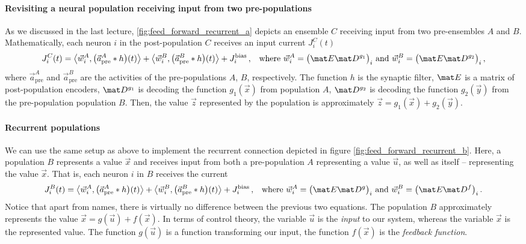 \documentclass[10pt,letterpaper,oneside]{article}
\begin{document}
\paragraph{Revisiting a neural population receiving input from two pre-populations}
As we discussed in the last lecture, \cref{fig:feed_forward_recurrent_a} depicts an ensemble $C$ receiving input from two pre-ensembles $A$ and $B$. Mathematically, each neuron $i$ in the post-population $C$ receives an input current $J^C_i(t)$
\begin{align*}
	J^C_i(t) &= \big\langle \vec w_i^A , \big ( \vec a^{A}_\mathrm{pre} \ast h \big)(t) \big\rangle
	        + \big\langle \vec w_i^B , \big ( \vec a^{B}_\mathrm{pre} \ast h \big)(t) \big\rangle
	        + J^\mathrm{bias}_i \,,
	       & \text{where } \vec w^A_i = \big( \mat E \mat D^{g_1} \big)_i \text{ and } \vec w^B_i = \big( \mat E \mat D^{g_2} \big)_i \,,
\end{align*}
where $\vec a^{A}_\mathrm{pre}$ and $\vec a^{B}_\mathrm{pre}$ are the activities of the pre-populations $A$, $B$, respectively. The function $h$ is the synaptic filter, $\mat E$ is a matrix of post-population encoders, $\mat D^{g_1}$ is decoding the function $g_1(\vec x)$ from population $A$, $\mat D^{g_2}$ is decoding the function ${g_2}(\vec y)$ from the pre-population population $B$. Then, the value $\vec z$ represented by the population is approximately $\vec z = g_1(\vec x) + g_2(\vec y)$.

\paragraph{Recurrent populations}
We can use the same setup as above to implement the recurrent connection depicted in figure \cref{fig:feed_forward_recurrent_b}. Here, a population $B$ represents a value $\vec x$ and receives input from both a pre-population $A$ representing a value $\vec u$, as well as itself -- representing the value $\vec x$. That is, each neuron $i$ in $B$ receives the current
\begin{align*}
	J^B_i(t) &= \big\langle \vec w_i^A , \big ( \vec a^{A}_\mathrm{pre} \ast h \big)(t) \big\rangle
			+ \big\langle \vec w_i^B , \big ( \vec a^{B}_\mathrm{pre} \ast h \big)(t) \big\rangle
			+ J^\mathrm{bias}_i \,,
			& \text{where } \vec w^A_i = \big( \mat E \mat D^{g} \big)_i \text{ and } \vec w^B_i = \big( \mat E \mat D^{f} \big)_i \,.
\end{align*}
Notice that apart from names, there is virtually no difference between the previous two equations. The population $B$ approximately represents the value $\vec x = g(\vec u) + f(\vec x)$. In terms of control theory, the variable $\vec u$ is the \emph{input} to our system, whereas the variable $\vec x$ is the represented value. The function $g(\vec u)$ is a function transforming our input, the function $f(\vec x)$ is the \emph{feedback function}.
\end{document}
